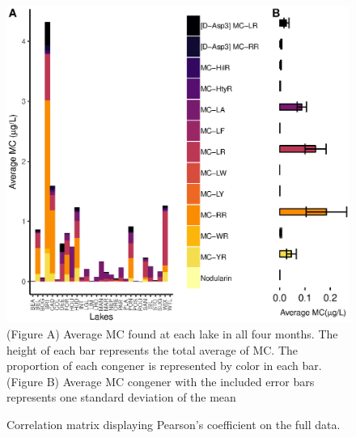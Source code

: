 \begin{figure}[!h]
 \includegraphics[width=\textwidth]{figures/congenerbar}
 \caption{
 (Figure A) Average MC found at each lake in all four months. The height of each bar represents the total average of MC. The proportion of each congener is represented by color in each bar. 
(Figure B) Average MC congener with the included error bars represents one standard deviation of the mean}
 \label{fig:congenerbar}
\end{figure}



\begin{figure}[!ht]
\vspace*{-15mm}
\vspace*{-15mm}
\caption{Correlation matrix displaying Pearson's coefficient on the full data.}
\label{fig:matrixfull}
\end{figure}


